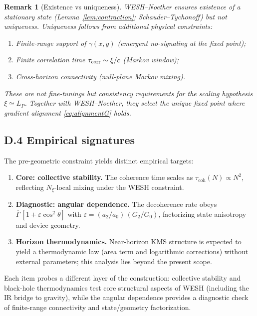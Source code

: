 \documentclass[12pt,a4paper]{article}
\newtheorem{remark}{Remark}[section]
\numberwithin{equation}{section}
\begin{document}
\begin{remark}[Existence vs uniqueness]\label{rem:H-unique}
WESH--Noether ensures \emph{existence} of a stationary state (Lemma~\ref{lem:contraction}; Schauder--Tychonoff) but not uniqueness. Uniqueness follows from additional physical constraints:
\begin{enumerate}[label=(\roman*),leftmargin=1.5cm,itemsep=0.2em]
\item Finite-range support of $\gamma(x,y)$ (emergent no-signaling at the fixed point);
\item Finite correlation time $\tau_{\rm corr}\sim\xi/c$ (Markov window);
\item Cross-horizon connectivity (null-plane Markov mixing).
\end{enumerate}
These are not fine-tunings but \emph{consistency requirements} for the scaling hypothesis $\xi\simeq L_P$. Together with WESH--Noether, they select the unique fixed point where gradient alignment \eqref{eq:alignmentG} holds.
\end{remark}

\subsection*{D.4 Empirical signatures}
\vspace{0.3cm}
The pre-geometric constraint yields distinct empirical targets:
\begin{enumerate}[leftmargin=1.2em,itemsep=0.25em]
\item \textbf{Core: collective stability.} The coherence time scales as $\tau_{\mathrm{coh}}(N)\propto N^2$, reflecting $N_\xi$-local mixing under the WESH constraint.
\item \textbf{Diagnostic: angular dependence.} The decoherence rate obeys $\overline\Gamma\,[1+\varepsilon\cos^2\theta]$ with $\varepsilon=(a_2/a_0)\,(G_2/G_0)$, factorizing state anisotropy and device geometry.
\item \textbf{Horizon thermodynamics.} Near-horizon KMS structure is expected to yield a thermodynamic law (area term and logarithmic corrections) without external parameters; this analysis lies beyond the present scope.
\end{enumerate}
Each item probes a different layer of the construction: collective stability and black-hole thermodynamics test core structural aspects of WESH (including the IR bridge to gravity), while the angular dependence provides a diagnostic check of finite-range connectivity and state/geometry factorization.
\vspace{0.3cm}
\end{document}

